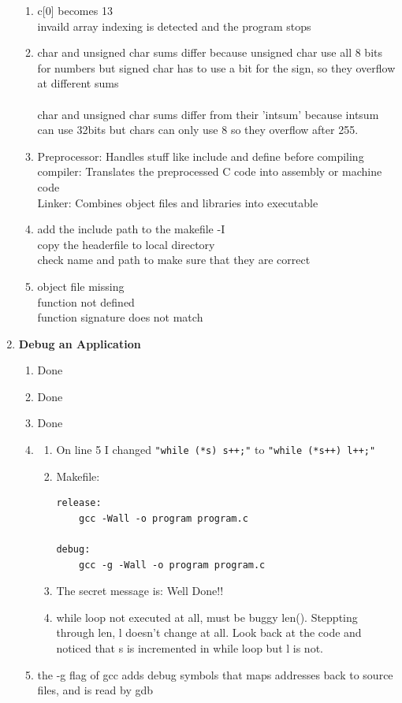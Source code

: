 \documentclass[12pt]{article}
\begin{document}
\begin{enumerate}
\begin{enumerate}[label=\arabic*)]
        \item c[0] becomes 13 \\
        invaild array indexing is detected and the program stops

        \item char and unsigned char sums differ because unsigned char use all 8 bits for numbers but signed char has to use a bit for the sign, so they overflow at different sums
        \\\\char and unsigned char sums differ from their 'intsum' because intsum can use 32bits but chars can only use 8 so they overflow after 255.

        \item Preprocessor: Handles stuff like include and define before compiling 
        \\compiler: Translates the preprocessed C code into assembly or machine code 
        \\Linker: Combines object files and libraries into executable

        \item add the include path to the makefile -I \\ copy the headerfile to local directory \\ check name and path to make sure that they are correct
        \item object file missing \\ function not defined \\ function signature does not match
    \end{enumerate}

    \item \textbf{Debug an Application}
    \begin{enumerate}[label=\arabic*)]
        \item Done
        \item Done
        \item Done
        \item \begin{enumerate}[label=\arabic*)]
        \item On line 5 I changed \texttt{"while (*s) s++;"} to \texttt{"while (*s++) l++;"}
        \item Makefile: \begin{verbatim}
release:
	gcc -Wall -o program program.c

debug:
	gcc -g -Wall -o program program.c
        \end{verbatim}
        \item The secret message is: Well Done!!
        \item while loop not executed at all, must be buggy len(). Steppting through len, l doesn't change at all. Look back at the code and noticed that s is incremented  in while loop but l is not. 
        \end{enumerate}
        \item the -g flag of gcc adds debug symbols that maps addresses back to source files, and is read by gdb


\end{enumerate}
\end{enumerate}
\end{document}
